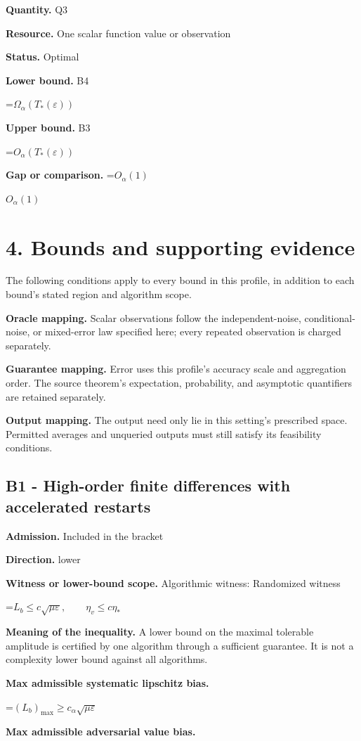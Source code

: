\documentclass[10pt,a4paper]{article}
\newcommand{\AtlasMath}[1]{\par\begingroup\centering\setbox0=\hbox{$\displaystyle #1$}\ifdim\wd0>1.4\linewidth\typeout{ATLAS WIDE FORMULA: \the\wd0}\fi\ifdim\wd0>\linewidth\resizebox{\linewidth}{!}{\box0}\else\box0\fi\par\endgroup}
\newcommand{\AtlasInlineMath}[1]{\begingroup\setbox0=\hbox{$#1$}\ifdim\wd0>.4\linewidth\endgroup\AtlasMath{#1}\else\endgroup$#1$\fi}
\begin{document}
\textbf{Quantity.} Q3

\textbf{Resource.} One scalar function value or observation

\textbf{Status.} Optimal

\textbf{Lower bound.} B4

\AtlasMath{\Omega_\alpha (T_*(\varepsilon ))}
\textbf{Upper bound.} B3

\AtlasMath{O_\alpha (T_*(\varepsilon ))}
\textbf{Gap or comparison.} \AtlasInlineMath{O_\alpha (1)}

\section{4. Bounds and supporting evidence}
The following conditions apply to every bound in this profile, in addition to each bound's stated region and algorithm scope.

\textbf{Oracle mapping.} Scalar observations follow the independent-noise, conditional-noise, or mixed-error law specified here; every repeated observation is charged separately.

\textbf{Guarantee mapping.} Error uses this profile's accuracy scale and aggregation order. The source theorem's expectation, probability, and asymptotic quantifiers are retained separately.

\textbf{Output mapping.} The output need only lie in this setting's prescribed space. Permitted averages and unqueried outputs must still satisfy its feasibility conditions.

\subsection{B1 - High-order finite differences with accelerated restarts}
\textbf{Admission.} Included in the bracket

\textbf{Direction.} lower

\textbf{Witness or lower-bound scope.} Algorithmic witness: Randomized witness

\AtlasMath{L_b\le c\sqrt{\mu\varepsilon},\qquad \eta_v\le c\eta_*}
\textbf{Meaning of the inequality.} A lower bound on the maximal tolerable amplitude is certified by one algorithm through a sufficient guarantee. It is not a complexity lower bound against all algorithms.

\textbf{Max admissible systematic lipschitz bias.}

\AtlasMath{(L_b)_{\max}\ge c_\alpha\sqrt{\mu\varepsilon}}
\textbf{Max admissible adversarial value bias.}
\end{document}
